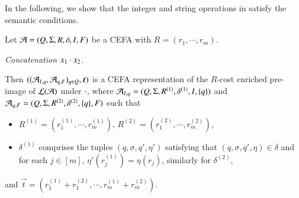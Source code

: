 \documentclass{llncs}
\begin{document}





In the following, we show that the integer and string operations in {\cslint} satisfy the semantic conditions.

Let $\mathcal{A}=(Q, \Sigma, R, \delta, I, F)$ be a CEFA with $R= (r_1, \cdots, r_m)$. 

\smallskip
\noindent \emph{Concatenation $x_1 \cdot x_2$}.

\smallskip

Then $((\Aut_{I, q}, \Aut_{q, F})_{q \in Q}, \vec{t})$ is a CEFA representation of the $R$-cost enriched pre-image of $\mathcal{L}(\mathcal{A})$ under $\cdot$, where $\mathcal{A}_{I, q}=(Q, \Sigma, R^{(1)}, \delta^{(1)}, I, \{q\})$ and  $\mathcal{A}_{q, F}=(Q, \Sigma, R^{(2)}, \delta^{(2)}, \{q\}, F)$ such that 
\begin{itemize}
\item $R^{(1)} = (r^{(1)}_1, \cdots, r^{(1)}_m)$, $R^{(2)} = (r^{(2)}_1, \cdots, r^{(2)}_m)$, 
\item $\delta^{(1)}$ comprises the tuples $(q, \sigma, q', \eta')$ satisfying that $(q, \sigma, q', \eta) \in \delta$ and for each $j \in [m]$, $\eta'(r^{(1)}_j)=\eta(r_j)$,  similarly for $\delta^{(2)}$,
\end{itemize}
and $\vec{t} = (r^{(1)}_1 + r^{(2)}_1, \cdots, r^{(1)}_m + r^{(2)}_m)$.
\end{document}

